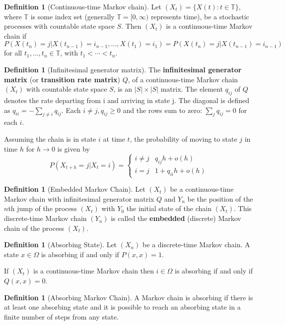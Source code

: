 \documentclass{article}
\theoremstyle{plain}
\theoremstyle{definition}
\newtheorem{defn}[theorem]{Definition}
\theoremstyle{remark}
\numberwithin{equation}{section}
\begin{document}
\begin{defn}[Continuous-time Markov chain] \cite{grimmett2001}
Let $(X_t) = \{X(t) : t \in \mathbb T\}$, where $\mathbb T$ is some index set (generally $\mathbb T = [0, \infty)$ represents time), be a stochastic processes with countable state space $S$.
Then $(X_t)$ is a continuous-time Markov chain if 
$$
P(X(t_n) = j | X(t_{n - 1}) = i_{n-1}, \ldots, X(t_1) = i_{1}) = P(X(t_n) = j | X(t_{n - 1}) = i_{n - 1})
$$
for all $t_1, \ldots, t_n \in \mathbb T$, with $t_1 < \cdots < t_n$.
\end{defn}

\begin{defn}[Infinitesimal generator matrix]
The \textbf{infinitesimal generator matrix} (or \textbf{transition rate matrix}) $Q$, of a continuous-time Markov chain $(X_t)$ with countable state space $S$, is an $|S| \times |S|$ matrix.
The element $q_{ij}$ of $Q$ denotes the rate departing from i and arriving in state j.
The diagonal is defined as $q_{ii} = - \sum_{j \not = i} q_{ij}$.
Each $i \not = j, q_{ij} \geq 0$ and the rows sum to zero: $\sum_{j} q_{ij} = 0$ for each $i$.

Assuming the chain is in state $i$ at time $t$, the probability of moving to state $j$ in time $h$ for $h \to 0$ is given by
$$
P(X_{t + h} = j | X_{t} = i) = \begin{cases}
    i \not = j & q_{ij} h + o(h)\\
    i = j & 1 + q_{ii} h + o(h)
\end{cases}
$$
\end{defn}

\begin{defn}[Embedded Markov Chain]
Let $(X_t)$ be a continuous-time Markov chain with infinitesimal generator matrix $Q$ and $Y_n$ be the position of the $n$th jump of the process $(X_t)$ with $Y_0$ the initial state of the chain $(X_t)$.
This discrete-time Markov chain $(Y_n)$ is called the \textbf{embedded} (discrete) Markov chain of the process $(X_t)$.
\end{defn}

\begin{defn}[Absorbing State] \cite{grinstead2003}
Let $(X_n)$ be a discrete-time Markov chain.
A state $x \in \Omega$ is absorbing if and only if $P(x,x) = 1$.

If $(X_t)$ is a continuous-time Markov chain then $i \in \Omega$ is absorbing if and only if $Q(x,x) = 0$.
\end{defn}

\begin{defn}[Absorbing Markov Chain] \cite{grinstead2003}
A Markov chain is absorbing if there is at least one absorbing state and it is possible to reach an absorbing state in a finite number of steps from any state.
\end{defn}
\end{document}
